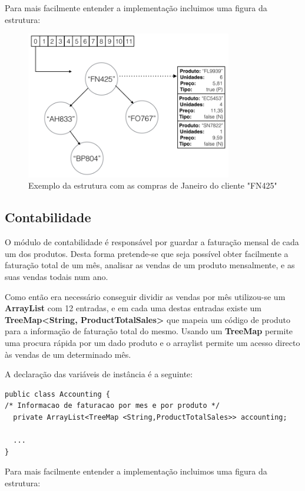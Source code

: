 \documentclass[10pt] {article}
\begin{document}
Para mais facilmente entender a implementação incluimos uma figura da estrutura:

\begin{figure}[ht!]
\centering
\includegraphics[width=90mm]{sales.png}
\caption{Exemplo da estrutura com as compras de Janeiro do cliente "FN425"}
\label{fig:sales}
\end{figure}

\subsection{Contabilidade}

O módulo de contabilidade é responsável por guardar a faturação mensal de cada um dos produtos.
Desta forma pretende-se que seja possível obter facilmente a faturação total de um mês, analisar as vendas de um produto mensalmente, e as suas vendas todais num ano.

Como então era necessário conseguir dividir as vendas por mês utilizou-se um \textbf{ArrayList} com 12 entradas, e em cada uma destas entradas existe um \textbf{TreeMap\textless String, ProductTotalSales\textgreater} que mapeia um código de produto para a informação de faturação total do mesmo.
Usando um \textbf{TreeMap} permite uma procura rápida por um dado produto e o arraylist permite um acesso directo às vendas de um determinado mês.

A declaração das variáveis de instância é a seguinte:

\begin{lstlisting}
public class Accounting {
/* Informacao de faturacao por mes e por produto */
  private ArrayList<TreeMap <String,ProductTotalSales>> accounting;

  ...
}

\end{lstlisting}

Para mais facilmente entender a implementação incluimos uma figura da estrutura:
\end{document}
